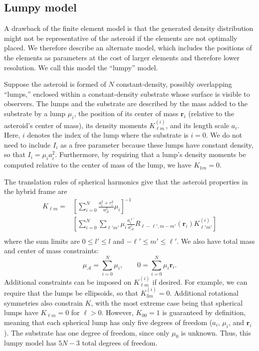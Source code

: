 \documentclass[fleqn,usenatbib]{mnras}
\newcommand{\brackets}[1]{\left[ #1 \right]}
\begin{document}
\subsection{Lumpy model}

A drawback of the finite element model is that the generated density distribution might not be representative of the asteroid if the elements are not optimally placed. We therefore describe an alternate model, which includes the positions of the elements as parameters at the cost of larger elements and therefore lower resolution. We call this model the ``lumpy'' model.

Suppose the asteroid is formed of $N$ constant-density, possibly overlapping ``lumps,'' enclosed within a constant-density substrate whose surface is visible to observers. The lumps and the substrate are described by the mass added to the substrate by a lump $\mu_i$, the position of its center of mass $\bm r_i$ (relative to the asteroid's center of mass), its density moments $K_{\ell m}^{(i)}$, and its length scale $a_i$. Here, $i$ denotes the index of the lump where the substrate is $i=0$.  We do not need to include $I_i$ as a free parameter because these lumps have constant density, so that $I_i = \mu_i a_i^2$. Furthermore, by requiring that a lump's density moments be computed relative to the center of mass of the lump, we have $K_{1m} = 0$.

The translation rules of spherical harmonics give that the asteroid properties in the hybrid frame are
\begin{equation}
  \begin{aligned}
    K_{\ell m} = &\brackets{\sum_{i=0}^N \frac{a_i^2 + r_i^2}
    {a_\mathcal{A}^2}\mu_i}^{-1} \\
    &\brackets{\sum_{i=0}^N \sum_{\ell' m'}\mu_i
    \frac{a_i^{\ell'}}{a_\mathcal{A}^\ell}
    R_{\ell - \ell', m - m'}(\bm r_i)K_{\ell' m'}^{(i)}} \\
  \end{aligned}
\end{equation}
where the sum limits are $0 \leq l' \leq l$ and $-\ell' \leq m' \leq \ell'$. We also have total mass and center of mass constraints:
\begin{equation}
  \mu_\mathcal{A} = \sum_{i=0}^N \mu_i,  \qquad 0 = \sum_{i=0}^N \mu_i \bm r_i.
\end{equation}
Additional constraints can be imposed on $K_{\ell m}^{(i)}$ if desired. For example, we can require that the lumps be ellipsoids, so that $K_{3 m}^{(i)} = 0$. Additional rotational symmetries also constrain $K$, with the most extreme case being that spherical lumps have $K_{\ell m} = 0$ for $\ell > 0$. However, $K_{00}=1$ is guaranteed by definition, meaning that each spherical lump has only five degrees of freedom ($a_i$, $\mu_i$, and $\bm r_i$). The substrate has one degree of freedom, since only $\mu_0$ is unknown. Thus, this lumpy model has $5N - 3$ total degrees of freedom.
\end{document}
